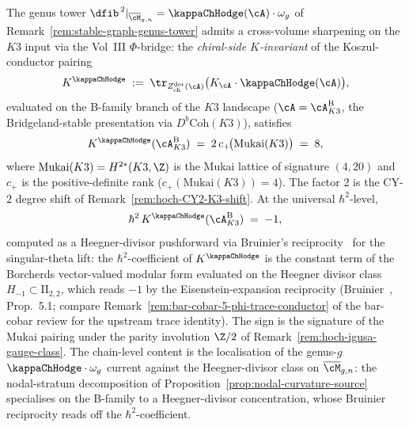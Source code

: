 \begin{remark}[$K^{\kappaChHodge}=8$ on the
Mukai-$K3$ branch and $\hbar^2 K^{\kappaChHodge}=-1$ via
Bruinier--Heegner reciprocity; \ClaimStatusProvedElsewhere]
\label{rem:hoch-Kkappa-Mukai-Bruinier}
%
%
The genus tower
$\dfib^{\,2}|_{\overline{\cM}_{g,n}}=\kappaChHodge(\cA)\cdot\omega_g$ of
Remark~\ref{rem:stable-graph-genus-tower} admits a cross-volume
sharpening on the $K3$ input via the Vol~III $\Phi$-bridge: the
\emph{chiral-side $K$-invariant} of the Koszul-conductor pairing
\[
K^{\kappaChHodge}
\;:=\;
\tr_{Z^{\mathrm{der}}_{\mathrm{ch}}(\cA)}
\bigl(K_\cA\cdot\kappaChHodge(\cA)\bigr),
\]
evaluated on the B-family branch of the $K3$ landscape
($\cA=\cA_{K3}^{\mathrm{B}}$, the Bridgeland-stable presentation via
$D^b\mathrm{Coh}(K3)$), satisfies
\[
K^{\kappaChHodge}(\cA_{K3}^{\mathrm{B}})
\;=\;
2\,c_+\!\bigl(\mathrm{Mukai}(K3)\bigr)
\;=\;8,
\]
where $\mathrm{Mukai}(K3)=H^{2\ast}(K3,\Z)$ is the Mukai lattice of
signature $(4,20)$ and $c_+$ is the positive-definite rank
($c_+(\mathrm{Mukai}(K3))=4$). The factor $2$ is the CY-$2$
degree shift of Remark~\ref{rem:hoch-CY2-K3-shift}. At the
universal $\hbar^2$-level,
\[
\hbar^2\,K^{\kappaChHodge}(\cA_{K3}^{\mathrm{B}})
\;=\;-1,
\]
computed as a Heegner-divisor pushforward via Bruinier's
reciprocity~\cite{Bru02} for the singular-theta lift: the
$\hbar^2$-coefficient of $K^{\kappaChHodge}$ is the
constant term of the Borcherds vector-valued modular form
evaluated on the Heegner divisor class $H_{-1}\subset\mathrm{II}_{2,2}$,
which reads $-1$ by the Eisenstein-expansion reciprocity
(Bruinier~\cite{Bru02}, Prop.~5.1; compare
Remark~\ref{rem:bar-cobar-5-phi-trace-conductor} of the
bar-cobar review for the upstream trace identity). The sign is the
signature of the Mukai pairing under the parity involution
$\Z/2$ of Remark~\ref{rem:hoch-igusa-gauge-class}. The
chain-level content is the localisation of the genus-$g$
$\kappaChHodge\cdot\omega_g$ current against the
Heegner-divisor class on $\overline{\cM}_{g,n}$: the nodal-stratum
decomposition of
Proposition~\ref{prop:nodal-curvature-source} specialises on the
B-family to a Heegner-divisor concentration, whose Bruinier
reciprocity reads off the $\hbar^2$-coefficient.
\end{remark}


